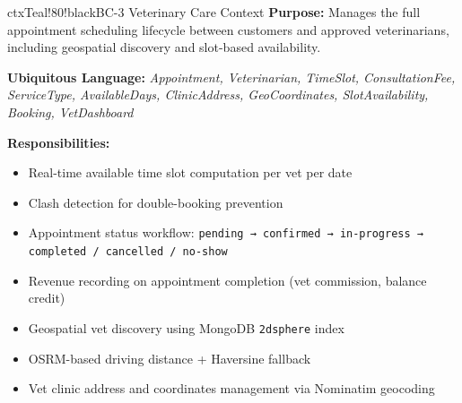 \documentclass[12pt,a4paper]{article}
\begin{document}
\vspace{0.5em}

\begin{contextbox}{ctxTeal!80!black}{BC-3 \quad Veterinary Care Context}
\textbf{Purpose:} Manages the full appointment scheduling lifecycle between customers and approved veterinarians, including geospatial discovery and slot-based availability.

\textbf{Ubiquitous Language:} \textit{Appointment, Veterinarian, TimeSlot, ConsultationFee, ServiceType, AvailableDays, ClinicAddress, GeoCoordinates, SlotAvailability, Booking, VetDashboard}

\textbf{Responsibilities:}
\begin{itemize}
  \item Real-time available time slot computation per vet per date
  \item Clash detection for double-booking prevention
  \item Appointment status workflow: \texttt{pending → confirmed → in-progress → completed / cancelled / no-show}
  \item Revenue recording on appointment completion (vet commission, balance credit)
  \item Geospatial vet discovery using MongoDB \texttt{2dsphere} index
  \item OSRM-based driving distance + Haversine fallback
  \item Vet clinic address and coordinates management via Nominatim geocoding
\end{itemize}
\end{contextbox}

\vspace{0.5em}
\end{document}
